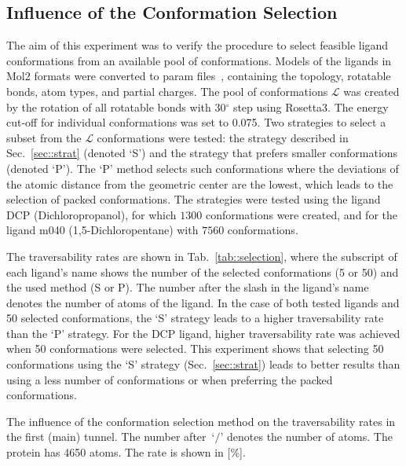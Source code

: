 \documentclass[usletter, 10pt, conference]{ieeeconf} %
\def\L{\mathcal{L}}
\begin{document}
\subsection{Influence of the Conformation Selection}

The aim of this experiment was to verify the procedure to select feasible ligand conformations from an available pool of conformations.
Models  of the ligands in Mol2 formats were converted to param files~\cite{meiler2006rosettaligand}, containing the topology, rotatable bonds, atom types, and partial charges. 
The pool of conformations $\L$ was created by the rotation of all rotatable bonds with 30$^\circ$ step using Rosetta3.
The energy cut-off for individual conformations was set to 0.075. %
Two strategies to select a subset from the $\L$ conformations were tested: 
the strategy described in Sec.~\ref{sec::strat} (denoted `S') and the strategy that prefers smaller conformations (denoted `P').
The `P' method selects such conformations where the deviations of the atomic distance from the geometric center are the lowest, which leads 
to the selection of packed conformations.
The strategies were tested using the ligand DCP (Dichloropropanol), for which $1300$ conformations were created, and for the ligand
m040 (1,5-Dichloropentane) with $7560$ conformations.

The traversability rates are shown in Tab.~\ref{tab::selection}, where the subscript of each ligand's 
name shows the number of the selected conformations (5 or 50) and the used method (S or P).
The number after the slash in the ligand's name denotes the number of atoms of the ligand.
In the case of both tested ligands and 50 selected conformations, the `S' strategy leads to a higher traversability rate than the `P' strategy.
For the DCP ligand, higher traversability rate was achieved when 50 conformations were selected.
This experiment shows that selecting 50 conformations using the `S' strategy (Sec.~\ref{sec::strat}) leads to better results
than using a less number of conformations or when preferring the packed conformations.

\begin{table}[ht]
\centering
\caption{\label{tab::selection}
    \small
    The influence of the conformation selection method on the traversability rates in the first (main) tunnel.
    The number after~`$/$' denotes the number of atoms.
    The protein has 4650 atoms. 
    The rate is shown in [\%].
}
\small
\renewcommand{\tabcolsep}{4.3pt}
{\scriptsize
\renewcommand{\arraystretch}{0.7}

}
\end{table}
\end{document}
